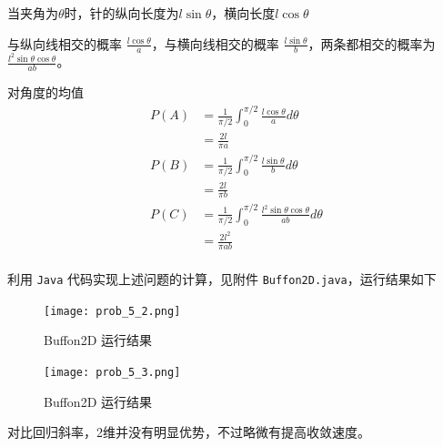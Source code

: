 \documentclass[12pt,a4paper]{article}%
\begin{document}
当夹角为$\theta$时，针的纵向长度为$l \sin \theta$，横向长度$l\cos\theta$

与纵向线相交的概率 \(\frac{l \cos{\theta}}{a}\)，与横向线相交的概率 \(\frac{l \sin{\theta}}{b}\)，两条都相交的概率为 \(\frac{l^2 \sin{\theta} \cos{\theta}}{ab}\)。

对角度的均值
\begin{equation*}
    \begin{align*}
        P(A) & = \frac{1}{\pi / 2} \int_{0}^{\pi / 2} \frac{l \cos{\theta}}{a} d \theta \\
        & = \frac{2l}{\pi a} \\
        P(B) & = \frac{1}{\pi / 2} \int_{0}^{\pi / 2} \frac{l \sin{\theta}}{b} d \theta \\
        & = \frac{2l}{\pi b} \\
        P(C) & = \frac{1}{\pi / 2} \int_{0}^{\pi / 2} \frac{l^2 \sin{\theta} \cos{\theta}}{ab} d \theta \\
        & = \frac{2l^2}{\pi ab} \\
    \end{align*}
\end{equation*}

利用 \texttt{Java} 代码实现上述问题的计算，见附件 \texttt{Buffon2D.java}，运行结果如下

\begin{figure}[H]%
    \centering
    \begin{minipage}{0.48\textwidth}
        \centering
        \texttt{[image: prob\_5\_2.png]}
        \caption{\fontsize{10pt}{15pt}\selectfont Buffon2D 运行结果}
    \end{minipage}
    \hspace{0cm}%
    \hfill%
    \begin{minipage}{0.48\textwidth}
        \centering
        \texttt{[image: prob\_5\_3.png]}
        \caption{\fontsize{10pt}{15pt}\selectfont Buffon2D 运行结果}
    \end{minipage}\label{fig:figure2}
\end{figure}

对比回归斜率，2维并没有明显优势，不过略微有提高收敛速度。
\end{document}
